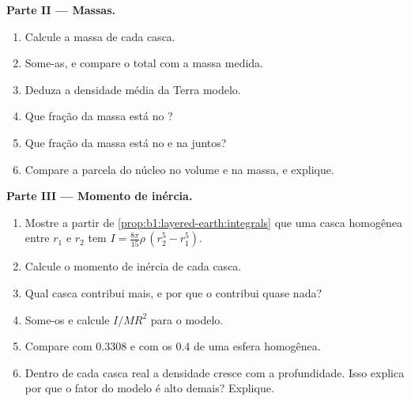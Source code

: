 \begin{problem}
\noindent\textbf{Parte II --- Massas.}
\begin{enumerate}[resume]
  \item Calcule a massa de cada casca.
  \item Some-as, e compare o total com a massa medida.
  \item Deduza a densidade média da Terra modelo.
  \item Que fração da massa está no ?
  \item Que fração da massa está no  e na  juntos?
  \item Compare a parcela do núcleo no volume e na massa, e explique.
\end{enumerate}

\noindent\textbf{Parte III --- Momento de inércia.}
\begin{enumerate}[resume]
  \item Mostre a partir de \cref{prop:b1:layered-earth:integrals} que uma casca homogênea entre $r_1$ e $r_2$ tem $I = \tfrac{8\pi}{15}\rho\,(r_2^5 - r_1^5)$.
  \item Calcule o momento de inércia de cada casca.
  \item Qual casca contribui mais, e por que o  contribui quase nada?
  \item Some-os e calcule $I/MR^2$ para o modelo.
  \item Compare com $0.3308$ e com os $0.4$ de uma esfera homogênea.
  \item Dentro de cada casca real a densidade cresce com a profundidade. Isso explica por que o fator do modelo é alto demais? Explique.
\end{enumerate}


\end{problem}
